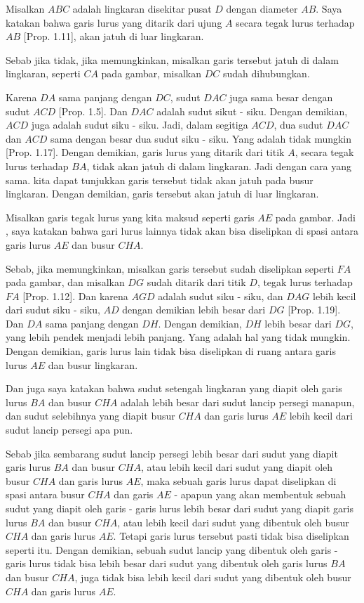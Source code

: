 \documentclass[a4paper]{book}
\begin{document}
Misalkan $ABC$ adalah lingkaran disekitar pusat $D$ dengan diameter $AB$. Saya 
katakan bahwa garis lurus yang ditarik dari ujung $A$ secara tegak lurus 
terhadap $AB$ [Prop. 1.11], akan jatuh di luar lingkaran.

Sebab jika tidak, jika memungkinkan, misalkan garis tersebut jatuh di dalam 
lingkaran, seperti $CA$ pada gambar, misalkan $DC$ sudah dihubungkan.

Karena $DA$ sama panjang dengan $DC$, sudut $DAC$ juga sama besar dengan sudut
$ACD$ [Prop. 1.5]. Dan $DAC$ adalah sudut sikut - siku. Dengan demikian, $ACD$
juga adalah sudut siku - siku. Jadi, dalam segitiga $ACD$, dua sudut $DAC$ dan
$ACD$ sama dengan besar dua sudut siku - siku. Yang adalah tidak mungkin [Prop.
1.17]. Dengan demikian, garis lurus yang ditarik dari titik $A$, secara tegak
lurus terhadap $BA$, tidak akan jatuh di dalam lingkaran. Jadi dengan cara yang
sama. kita dapat tunjukkan garis tersebut tidak akan jatuh pada busur lingkaran.
Dengan demikian, garis tersebut akan jatuh di luar lingkaran.

Misalkan garis tegak lurus yang kita maksud seperti garis $AE$ pada gambar. Jadi
, saya katakan bahwa gari lurus lainnya tidak akan bisa diselipkan di spasi
antara garis lurus $AE$ dan busur $CHA$.

Sebab, jika memungkinkan, misalkan garis tersebut sudah diselipkan seperti $FA$
pada gambar, dan misalkan $DG$ sudah ditarik dari titik $D$, tegak lurus 
terhadap $FA$ [Prop. 1.12]. Dan karena $AGD$ adalah sudut siku - siku, dan $DAG$
lebih kecil dari sudut siku - siku, $AD$ dengan demikian lebih besar dari $DG$
[Prop. 1.19]. Dan $DA$ sama panjang dengan $DH$. Dengan demikian, $DH$ lebih 
besar dari $DG$, yang lebih pendek menjadi lebih panjang. Yang adalah 
hal yang tidak mungkin. Dengan demikian, garis lurus lain tidak bisa diselipkan
di ruang antara garis lurus $AE$ dan busur lingkaran.

Dan juga saya katakan bahwa sudut setengah lingkaran yang diapit oleh garis 
lurus $BA$ dan busur $CHA$ adalah lebih besar dari sudut lancip persegi
manapun, dan sudut selebihnya yang diapit busur $CHA$ dan garis lurus $AE$ lebih
kecil dari sudut lancip persegi apa pun.

Sebab jika sembarang sudut lancip persegi lebih besar dari sudut yang diapit 
garis lurus $BA$ dan busur $CHA$, atau lebih kecil dari sudut yang diapit 
oleh busur $CHA$ dan garis lurus $AE$, maka sebuah garis lurus dapat diselipkan 
di spasi antara busur $CHA$ dan garis $AE$ - apapun yang akan membentuk sebuah 
sudut yang diapit oleh garis - garis lurus lebih besar dari sudut yang diapit 
garis lurus $BA$ dan busur $CHA$, atau lebih kecil dari sudut yang dibentuk
oleh busur $CHA$ dan garis lurus $AE$. Tetapi garis lurus tersebut pasti tidak 
bisa diselipkan seperti itu. Dengan demikian, sebuah sudut lancip yang dibentuk
oleh garis - garis lurus tidak bisa lebih besar dari sudut yang dibentuk oleh 
garis lurus $BA$ dan busur $CHA$, juga tidak bisa lebih kecil dari sudut yang
dibentuk oleh busur $CHA$ dan garis lurus $AE$.  
\end{document}
